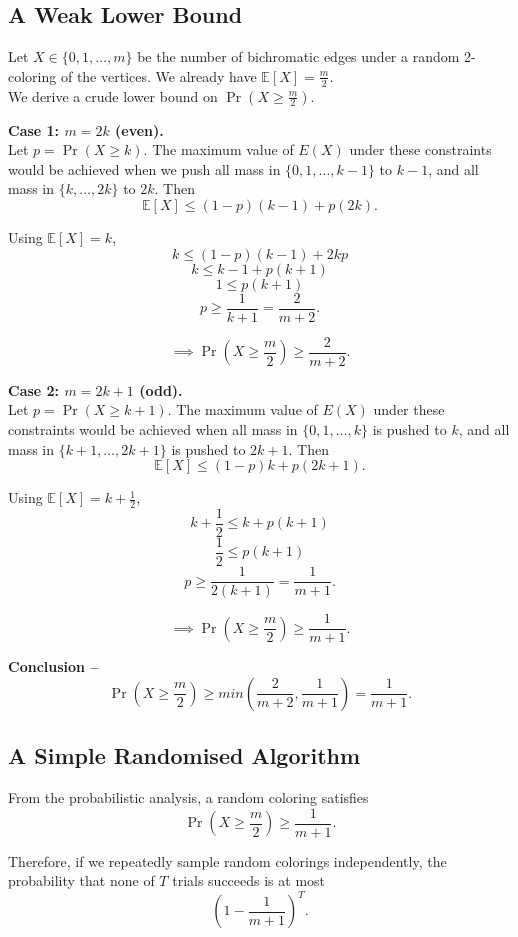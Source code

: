 \documentclass[11pt,openany]{book}
\begin{document}
\subsection*{A Weak Lower Bound}

Let $X\in\{0,1,\dots,m\}$ be the number of bichromatic edges under a random 2-coloring of the vertices. We already have
$\mathbb{E}[X]=\frac{m}{2}$. \\

\noindent We derive a crude lower bound on $\Pr\!\left(X\ge \frac{m}{2}\right)$.

\medskip
\noindent\textbf{Case 1: $m=2k$ (even).}\\

\noindent Let $p=\Pr(X\ge k)$. The maximum value of $E(X)$ under these constraints would be achieved 
when we push all mass in $\{0,1,\dots,k-1\}$ to $k-1$, and all mass in $\{k,\dots,2k\}$ to $2k$. Then
\[
\mathbb{E}[X]\le (1-p)(k-1)+p(2k).
\]

Using $\mathbb{E}[X]=k$,
\[
k \le (1-p)(k-1)+2kp
\]
\[
k \le k-1+p(k+1)
\]
\[
1 \le p(k+1)
\]
\[
p \ge \frac{1}{k+1}=\frac{2}{m+2}.
\]

\[
\implies
\Pr\!\left(X\ge \frac{m}{2}\right)\ge \frac{2}{m+2}.
\]

\medskip
\noindent\textbf{Case 2: $m=2k+1$ (odd).}\\

\noindent Let $p=\Pr(X\ge k+1)$. The maximum value of $E(X)$ under these constraints would be achieved when
all mass in $\{0,1,\dots,k\}$ is pushed to $k$, and all mass in $\{k+1,\dots,2k+1\}$ is pushed to $2k+1$. 
Then
\[
\mathbb{E}[X]\le (1-p)k+p(2k+1).
\]

Using $\mathbb{E}[X]=k+\tfrac{1}{2}$,
\[
k+\frac{1}{2} \le k+p(k+1)
\]
\[
\frac{1}{2} \le p(k+1)
\]
\[
p \ge \frac{1}{2(k+1)}=\frac{1}{m+1}.
\]

\[
\implies
\Pr\!\left(X\ge \frac{m}{2}\right)\ge \frac{1}{m+1}.
\]

\medskip
\textbf{Conclusion --}
\[
\Pr\!\left(X\ge \frac{m}{2}\right)\ge min(\frac{2}{m+2},\frac{1}{m+1}) = \frac{1}{m+1}.
\]

\subsection{A Simple Randomised Algorithm}

From the probabilistic analysis, a random coloring satisfies
\[
\Pr\left(X \ge \frac{m}{2}\right) \ge \frac{1}{m+1}.
\]

Therefore, if we repeatedly sample random colorings independently, 
the probability that none of $T$ trials succeeds is at most
\[
(1-\frac{1}{m+1})^T.
\]
\end{document}

